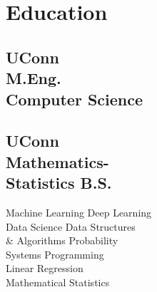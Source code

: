\documentclass[]{resume-template}
\begin{document}
%
%
\lastupdated{}

%
%

%
%

\begin{minipage}[t]{0.33\textwidth}


  \section{Education}\label{sec:education}

  \subsection{UConn\\  M.Eng.\\ Computer Science}
  \vspace{\topsep}
  \subsection{UConn\\
  Mathematics-\\Statistics B.S.}\label{subsec:uconn}
  \vspace{\topsep}

  \label{subsec:coursework}
  Machine Learning \textbullet{}Deep Learning\\
  Data Science \textbullet{} Data Structures \\\&
  Algorithms\textbullet{} Probability\\ Systems
  Programming\textbullet{} \\Linear
  Regression\textbullet{}\\Mathematical Statistics
  \sectionsep{}



\end{minipage}
\end{document}

